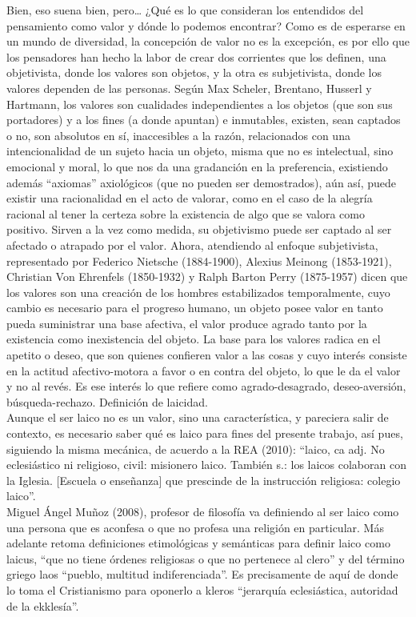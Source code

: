 \documentclass[12pt]{book} %
\begin{document}
Bien, eso suena bien, pero… ¿Qué es lo que consideran los entendidos del pensamiento como valor y dónde lo podemos encontrar? Como es de esperarse en un mundo de diversidad, la concepción de valor no es la excepción, es por ello que los pensadores han hecho la labor de crear dos corrientes que los definen, una objetivista, donde los valores son objetos, y la otra es subjetivista, donde los valores dependen de las personas. Según Max Scheler, Brentano, Husserl y Hartmann, los valores son cualidades independientes a los objetos (que son sus portadores) y a los fines (a donde apuntan) e inmutables, existen, sean captados o no, son absolutos en sí, inaccesibles a la razón, relacionados con una intencionalidad de un sujeto hacia un objeto, misma que no es intelectual, sino emocional y moral, lo que nos da una gradanción en la preferencia, existiendo además “axiomas” axiológicos (que no pueden ser demostrados), aún así, puede existir una racionalidad en el acto de valorar, como en el caso de la alegría racional al tener la certeza sobre la existencia de algo que se valora como positivo. Sirven a la vez como medida, su objetivismo puede ser captado al ser afectado o atrapado por el valor. Ahora, atendiendo al enfoque subjetivista, representado por Federico Nietsche (1884-1900), Alexius Meinong (1853-1921), Christian Von Ehrenfels (1850-1932) y Ralph Barton Perry (1875-1957) dicen que los valores son una creación de los hombres estabilizados temporalmente, cuyo cambio es necesario para el progreso humano, un objeto posee valor en tanto pueda suministrar una base afectiva, el valor produce agrado tanto por la existencia como inexistencia del objeto. La base para los valores radica en el apetito o deseo, que son quienes confieren valor a las cosas y cuyo interés consiste en la actitud afectivo-motora a favor o en contra del objeto, lo que le da el valor y no al revés. Es ese interés lo que refiere como agrado-desagrado, deseo-aversión, búsqueda-rechazo.
Definición de laicidad.\\

Aunque el ser laico no es un valor, sino una característica, y pareciera salir de contexto, es necesario saber qué es laico para fines del presente trabajo, así pues, siguiendo la misma mecánica, de acuerdo a la REA (2010): “laico, ca adj. No eclesiástico ni religioso, civil: misionero laico. También s.: los laicos colaboran con la Iglesia. [Escuela o enseñanza] que prescinde de la instrucción religiosa: colegio laico”.\\

Miguel Ángel Muñoz (2008), profesor de filosofía va definiendo al ser laico como una persona que es aconfesa o que no profesa una religión en particular. Más adelante retoma definiciones etimológicas y semánticas para definir laico como laicus, “que no tiene órdenes religiosas o que no pertenece al clero” y del término griego laos “pueblo, multitud indiferenciada”. Es precisamente de aquí de donde lo toma el Cristianismo para oponerlo a kleros “jerarquía eclesiástica, autoridad de la ekklesía”.\\
\end{document}
